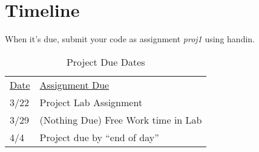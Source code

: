 \documentclass[]{tufte-handout}
\begin{document}
\newpage

\section{Timeline}

When it's due, submit your code as assignment \textit{proj1} using handin.
\begin{table}[!htpb]
  \begin{tabular}{ll}
    \underline{Date} & \underline{Assignment Due} \\
      3/22 & Project Lab Assignment \\
      3/29  & (Nothing Due) Free Work time in Lab \\
      4/4 & Project due by ``end of day''
  \end{tabular}
  \caption{Project Due Dates}\label{tab:duedates}
\end{table}
\end{document}
